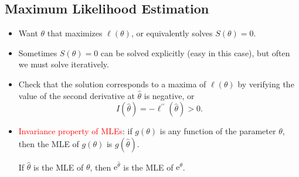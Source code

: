 \documentclass{article}\usepackage[]{graphicx}\usepackage[svgnames]{xcolor}
\begin{document}
\subsection*{Maximum Likelihood Estimation}
\begin{itemize}
      \item Want $ \theta $ that maximizes $ \ell(\theta) $, or equivalently solves $ S(\theta)=0 $.
      \item Sometimes $ S(\theta)=0 $ can be solved explicitly (easy in this case), but often we must solve iteratively.
      \item Check that the solution corresponds to a maxima of $ \ell(\theta) $ by verifying the value of the second derivative at $ \hat{\theta} $ is negative, or
            \[ I(\hat{\theta})=-\ell^{\prime\prime}(\hat{\theta})>0. \]
      \item \textcolor{Red}{Invariance property of MLEs}: if $ g(\theta) $ is any function of the parameter $ \theta $, then the MLE of $ g(\theta) $ is $ g(\hat{\theta}) $.
            \begin{Example}{}
                  If $ \hat{\theta} $ is the MLE of $ \theta $, then $ \mathrm{e}^{\hat{\theta}} $ is the MLE of $ \mathrm{e}^{\theta} $.
            \end{Example}
\end{itemize}
\end{document}
